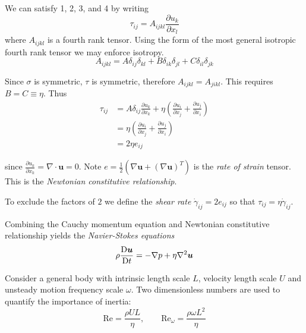 \documentclass{jknotes}
\begin{document}
We can satisfy 1, 2, 3, and 4 by writing
\begin{equation}
	\tau_{ij} = A_{ijkl}\frac{\partial u_k}{\partial x_l}
\end{equation}
where $A_{ijkl}$ is a fourth rank tensor. Using the form of the most general
isotropic fourth rank tensor we may enforce isotropy.
\begin{equation}
	A_{ijkl} = A \delta_{ij} \delta_{kl} + B \delta_{ik}\delta_{jl} + C
	\delta_{il}\delta_{jk}
\end{equation}

Since $\sigma$ is symmetric, $\tau$ is symmetric, therefore $A_{ijkl} =
A_{jikl}$. This requires $B = C \equiv \eta$. Thus
\begin{equation}
	\begin{aligned}
		\tau_{ij} &= A\delta_{ij} \frac{\partial u_k}{\partial x_k} + \eta
		\left( \frac{\partial u_i}{\partial x_j} + \frac{\partial
		u_j}{\partial x_i} \right) \\
		&= \eta \left( \frac{\partial u_i}{\partial x_j} + \frac{\partial
		u_j}{\partial x_i} \right) \\
		&= 2 \eta e_{ij}
	\end{aligned}
\end{equation}

since $\frac{\partial u_k}{\partial x_k} = \nabla \cdot \bm{u} = 0$. Note
$e = \frac{1}{2}\left(\nabla \bm{u} + (\nabla \bm{u})^T\right)$ is the
\emph{rate of strain} tensor. This is the \emph{Newtonian constitutive
	relationship}. 
	
\begin{defn}
	To exclude the factors of $2$ we define the \emph{shear rate}
	$\dot{\gamma}_{ij} = 2 e_{ij}$ so that $\tau_{ij} = \eta
	\dot{\gamma}_{ij}$.
\end{defn}

Combining the Cauchy momentum equation and Newtonian constitutive relationship
yields the \emph{Navier-Stokes equations}
\begin{equation}
	\rho \frac{\mathrm{D}{\bm{u}}}{\mathrm{D}{t}} = - \nabla p + \eta \nabla^2 \bm{u}
\end{equation}

Consider a general body with intrinsic length scale $L$, velocity length scale
$U$ and unsteady motion frequency scale $\omega$. Two dimensionless numbers
are used to quantify the importance of inertia:
\begin{equation}
	\text{Re} = \frac{\rho U L}{\eta}, \hspace{2em} \text{Re}_\omega =
	\frac{\rho \omega L^2}{\eta}
\end{equation}
\end{document}

